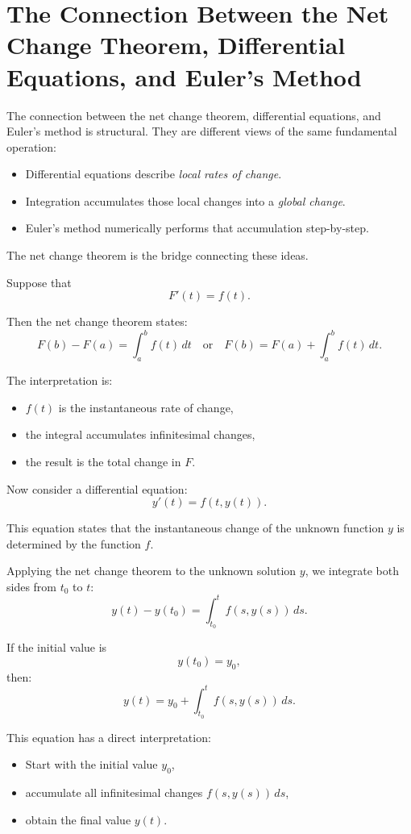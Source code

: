 \section{The Connection Between the Net Change Theorem, Differential Equations, and Euler's Method}

The connection between the net change theorem, differential equations, and Euler's method is structural.
They are different views of the same fundamental operation:

\begin{itemize}
  \item Differential equations describe \emph{local rates of change}.
  \item Integration accumulates those local changes into a \emph{global change}.
  \item Euler's method numerically performs that accumulation step-by-step.
\end{itemize}

The net change theorem is the bridge connecting these ideas.

Suppose that
\[
  F'(t)=f(t).
\]

Then the net change theorem states:
\[
  F(b)-F(a)=\int_a^b f(t)\,dt \quad \text{or} \quad F(b)=F(a)+\int_a^b f(t)\,dt.
\]

The interpretation is:

\begin{itemize}
  \item \(f(t)\) is the instantaneous rate of change,
  \item the integral accumulates infinitesimal changes,
  \item the result is the total change in \(F\).
\end{itemize}

Now consider a differential equation:
\[
  y'(t)=f(t,y(t)).
\]

This equation states that the instantaneous change of the unknown function \(y\) is determined by the function \(f\).

Applying the net change theorem to the unknown solution \(y\), we integrate both sides from \(t_0\) to \(t\):
\[
  y(t)-y(t_0)=\int_{t_0}^t f(s,y(s))\,ds.
\]

If the initial value is
\[
  y(t_0)=y_0,
\]
then:
\[
  y(t)=y_0+\int_{t_0}^t f(s,y(s))\,ds.
\]

This equation has a direct interpretation:

\begin{itemize}
  \item Start with the initial value \(y_0\),
  \item accumulate all infinitesimal changes \(f(s,y(s))\,ds\),
  \item obtain the final value \(y(t)\).
\end{itemize}

